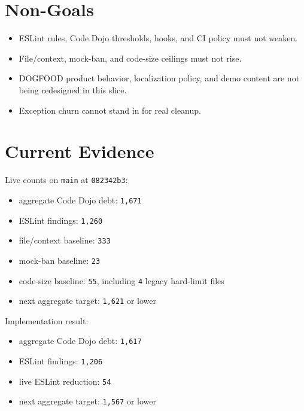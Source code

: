 \section{Non-Goals}\label{record-224-non-goals}

\begin{itemize}
\tightlist
\item
  ESLint rules, Code Dojo thresholds, hooks, and CI policy must not weaken.
\item
  File/context, mock-ban, and code-size ceilings must not rise.
\item
  DOGFOOD product behavior, localization policy, and demo content are not being redesigned in this slice.
\item
  Exception churn cannot stand in for real cleanup.
\end{itemize}

\section{Current Evidence}\label{record-224-current-evidence}

Live counts on \texttt{m\allowbreak{}a\allowbreak{}i\allowbreak{}n} at \texttt{0\allowbreak{}8\allowbreak{}2\allowbreak{}3\allowbreak{}4\allowbreak{}2\allowbreak{}b\allowbreak{}3}:

\begin{itemize}
\tightlist
\item
  aggregate Code Dojo debt: \texttt{1\allowbreak{},\allowbreak{}6\allowbreak{}7\allowbreak{}1}
\item
  ESLint findings: \texttt{1\allowbreak{},\allowbreak{}2\allowbreak{}6\allowbreak{}0}
\item
  file/context baseline: \texttt{3\allowbreak{}3\allowbreak{}3}
\item
  mock-ban baseline: \texttt{2\allowbreak{}3}
\item
  code-size baseline: \texttt{5\allowbreak{}5}, including \texttt{4} legacy hard-limit files
\item
  next aggregate target: \texttt{1\allowbreak{},\allowbreak{}6\allowbreak{}2\allowbreak{}1} or lower
\end{itemize}

Implementation result:

\begin{itemize}
\tightlist
\item
  aggregate Code Dojo debt: \texttt{1\allowbreak{},\allowbreak{}6\allowbreak{}1\allowbreak{}7}
\item
  ESLint findings: \texttt{1\allowbreak{},\allowbreak{}2\allowbreak{}0\allowbreak{}6}
\item
  live ESLint reduction: \texttt{5\allowbreak{}4}
\item
  next aggregate target: \texttt{1\allowbreak{},\allowbreak{}5\allowbreak{}6\allowbreak{}7} or lower
\end{itemize}

